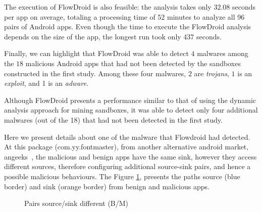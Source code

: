 The execution of FlowDroid is also feasible: the analysis takes only
32.08 seconds per app on average, totaling a processing time of 52
minutes to analyze all 96 pairs of Android apps.
Even though the time to execute the FlowDroid analysis depends on the size
of the app, the longest run took only 437 seconds. 

Finally, we can highlight that FlowDroid was able to detect $4$ malwares among the $18$ malicious Android apps that had not
been detected by the sandboxes constructed in the first study. Among these
four malwares, $2$ are \emph{trojans}, $1$ is an \emph{exploit}, and 1 is an \emph{adware}.

\begin{finding}
  Although FlowDroid presents a performance similar
  to that of using the dynamic analysis approach for mining sandboxes,
  it was able to detect only four additional malwares (out of the
  18) that had not been detected in the first study. 
\end{finding}

Here we present details about one of the malware that Flowdroid had detected. At this package (com.yy.fontmaster), from another alternative android market, angeeks~\cite{angeeks}, the malicious and benign apps have the same sink, however they access different sources, therefore configuring additional source-sink pairs, and hence a possible malicious behaviours. The Figure \ref{fig:sourcesink}, presents the paths source (blue border) and sink (orange border) from benign and malicious apps.

\begin{figure}[ht]%
    \centering
    \qquad
    \caption{Pairs source/sink different (B/M)}%
    \label{fig:sourcesink}%
\end{figure}

